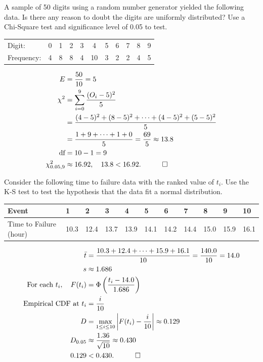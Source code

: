\begin{hwkProblem}{5}{}

	A sample of 50 digits using a random number generator yielded the following data. Is there any reason to doubt the digits are uniformly distributed? Use a Chi-Square test and significance level of 0.05 to test.
	\begin{center}
		\begin{tabular}{lllllclllll}
			Digit: & 0 & 1 & 2 & 3 & 4 & 5 & 6 & 7 & 8 & 9 \\
			Frequency: & 4 & 8 & 8 & 4 & 10 & 3 & 2 & 2 & 4 & 5 \\
		\end{tabular}
	\end{center}

	\hwkSol

	\begin{align*}
		E &= \frac{50}{10} = 5 \\
		\chi^2 &= \sum_{i=0}^{9} \frac{(O_i-5)^2}{5} \\
		       &= \frac{(4-5)^2+(8-5)^2+\cdots+(4-5)^2+(5-5)^2}{5} \\
		       &= \frac{1+9+\cdots+1+0}{5} = \frac{69}{5} \approx 13.8 \\
		\text{df} &= 10 - 1 = 9 \\
		\chi^2_{0.05,9} &\approx 16.92,\quad 13.8 < 16.92. \quad \qed
	\end{align*}

\end{hwkProblem}

\begin{hwkProblem}{6}{}

	Consider the following time to failure data with the ranked value of \( t_{i} \). Use the K-S test to test the hypothesis that the data fit a normal distribution.
	\begin{center}
		\begin{tabular}{l|llllllllll}
			\hline
			Event & 1 & 2 & 3 & 4 & 5 & 6 & 7 & 8 & 9 & 10 \\
			\hline
			Time to Failure (hour) & 10.3 & 12.4 & 13.7 & 13.9 & 14.1 & 14.2 & 14.4 & 15.0 & 15.9 & 16.1 \\
			\hline
		\end{tabular}
	\end{center}

	\hwkSol

	\begin{align*}
		\bar{t} &= \frac{10.3+12.4+\cdots+15.9+16.1}{10} = \frac{140.0}{10} = 14.0 \\
		s &\approx 1.686 \\
		\text{For each } t_i,\quad F(t_i) &= \Phi\left(\frac{t_i-14.0}{1.686}\right) \\
		\text{Empirical CDF at } t_i &= \frac{i}{10} \\
		D &= \max_{1\le i\le 10} \left|F(t_i)-\frac{i}{10}\right| \approx 0.129 \\
		D_{0.05} &\approx \frac{1.36}{\sqrt{10}} \approx 0.430 \\
		0.129 &< 0.430. \quad \qed
	\end{align*}

\end{hwkProblem}


